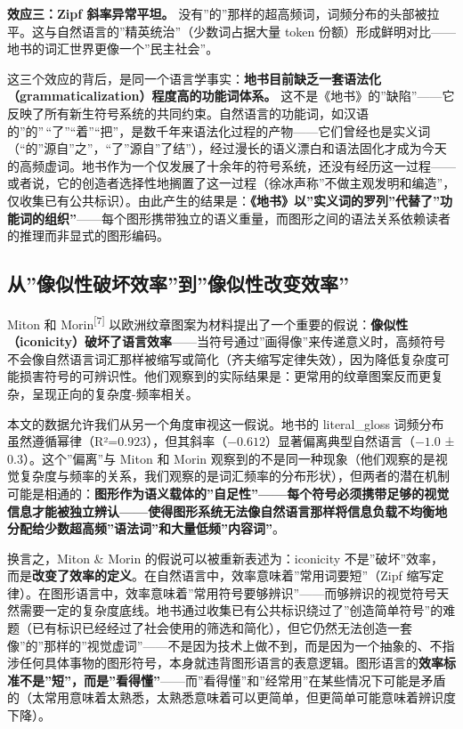 \documentclass[12pt,a4paper,UTF8,fontset=founder]{ctexart}
\begin{document}
\textbf{效应三：Zipf 斜率异常平坦。} 没有''的''那样的超高频词，词频分布的头部被拉平。这与自然语言的''精英统治''（少数词占据大量 token 份额）形成鲜明对比------地书的词汇世界更像一个''民主社会''。

这三个效应的背后，是同一个语言学事实：\textbf{地书目前缺乏一套语法化（grammaticalization）程度高的功能词体系。} 这不是《地书》的''缺陷''------它反映了所有新生符号系统的共同约束。自然语言的功能词，如汉语的''的''\,``了''``着''``把''，是数千年来语法化过程的产物------它们曾经也是实义词（``的''源自''之''，``了''源自''了结''），经过漫长的语义漂白和语法固化才成为今天的高频虚词。地书作为一个仅发展了十余年的符号系统，还没有经历这一过程------或者说，它的创造者选择性地搁置了这一过程（徐冰声称''不做主观发明和编造''，仅收集已有公共标识）。由此产生的结果是：\textbf{《地书》以''实义词的罗列''代替了''功能词的组织''}------每个图形携带独立的语义重量，而图形之间的语法关系依赖读者的推理而非显式的图形编码。

\subsection{从''像似性破坏效率''到''像似性改变效率''}\label{ux4eceux50cfux4f3cux6027ux7834ux574fux6548ux7387ux5230ux50cfux4f3cux6027ux6539ux53d8ux6548ux7387}

Miton 和 Morin\textsuperscript{{[}7{]}} 以欧洲纹章图案为材料提出了一个重要的假说：\textbf{像似性（iconicity）破坏了语言效率}------当符号通过''画得像''来传递意义时，高频符号不会像自然语言词汇那样被缩写或简化（齐夫缩写定律失效），因为降低复杂度可能损害符号的可辨识性。他们观察到的实际结果是：更常用的纹章图案反而更复杂，呈现正向的复杂度-频率相关。

本文的数据允许我们从另一个角度审视这一假说。地书的 literal\_gloss 词频分布虽然遵循幂律（R²=$0.923$），但其斜率（$-0.612$）显著偏离典型自然语言（$-1.0$ ± $0.3$）。这个''偏离''与 Miton 和 Morin 观察到的不是同一种现象（他们观察的是视觉复杂度与频率的关系，我们观察的是词汇频率的分布形状），但两者的潜在机制可能是相通的：\textbf{图形作为语义载体的''自足性''------每个符号必须携带足够的视觉信息才能被独立辨认------使得图形系统无法像自然语言那样将信息负载不均衡地分配给少数超高频''语法词''和大量低频''内容词''}。

换言之，Miton \& Morin 的假说可以被重新表述为：iconicity 不是''破坏''效率，而是\textbf{改变了效率的定义}。在自然语言中，效率意味着''常用词要短''（Zipf 缩写定律）。在图形语言中，效率意味着''常用符号要够辨识''------而够辨识的视觉符号天然需要一定的复杂度底线。地书通过收集已有公共标识绕过了''创造简单符号''的难题（已有标识已经经过了社会使用的筛选和简化），但它仍然无法创造一套像''的''那样的''视觉虚词''------不是因为技术上做不到，而是因为一个抽象的、不指涉任何具体事物的图形符号，本身就违背图形语言的表意逻辑。图形语言的\textbf{效率标准不是''短''，而是''看得懂''}------而''看得懂''和''经常用''在某些情况下可能是矛盾的（太常用意味着太熟悉，太熟悉意味着可以更简单，但更简单可能意味着辨识度下降）。
\end{document}
